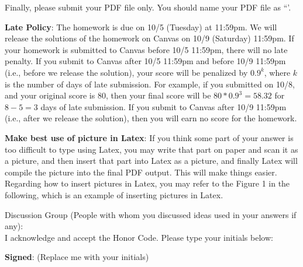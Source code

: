 \documentclass[12pt]{article}
\begin{document}
Finally, please submit your PDF file only. You should name your PDF file as ``{\color{blue}{Firstname-Lastname-NetID.pdf'}}'.

\vspace{.5cm}

\textbf{Late Policy}: The homework is due on 10/5 (Tuesday) at 11:59pm. We will release the solutions of the homework on Canvas on 10/9 (Saturday) 11:59pm. If your homework is submitted to Canvas before 10/5 11:59pm, there will no late penalty. If you submit to Canvas after 10/5 11:59pm and before 10/9 11:59pm (i.e., before we release the solution), your score will be penalized by $0.9^k$, where $k$ is the number of days of late submission. For example, if you submitted on 10/8, and your original score is 80, then your final score will be $80*0.9^3=58.32$ for $8-5=3$ days of late submission. If you submit to Canvas after 10/9 11:59pm (i.e., after we release the solution), then you will earn no score for the homework.

\vspace{.5cm}

\textbf{Make best use of picture in Latex}: If you think some part of your answer is too difficult to type using Latex, you may write that part on paper and scan it as a picture, and then insert that part into Latex as a picture, and finally Latex will compile the picture into the final PDF output. This will make things easier. Regarding how to insert pictures in Latex, you may refer to the Figure 1 in the following, which is an example of inserting pictures in Latex.


\hrulefill

Discussion Group (People with whom you discussed ideas used in your answers if any):     \\[1ex]


I acknowledge and accept the Honor Code. Please type your initials below:

\textbf{Signed}: ({\color{blue}Replace me with your initials})

\hrulefill


\end{document}
